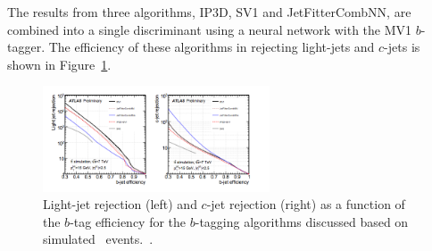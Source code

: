 The results from three algorithms, IP3D, SV1 and JetFitterCombNN, are combined into a single discriminant using a neural network with the MV1 $b$-tagger. The efficiency of these algorithms in rejecting light-jets and $c$-jets is shown in Figure~\ref{fig:btagEff}.

\begin{figure}[h]
\centering
\includegraphics[width=0.6\textwidth]{fig/obj/btageff.png}
\caption{Light-jet rejection (left) and $c$-jet rejection (right) as a function of the $b$-tag efficiency for the
$b$-tagging algorithms discussed based on simulated \ttbar\ events.~\cite{btagptrel}.}
\label{fig:btagEff}
\end{figure}


